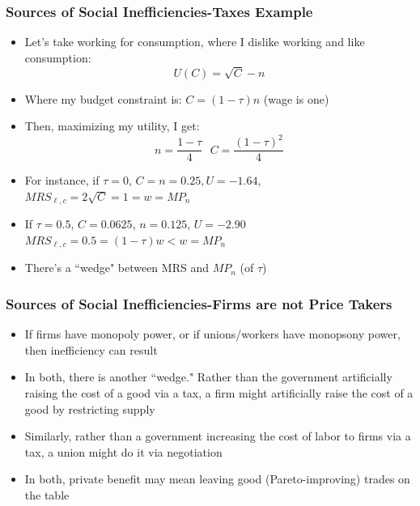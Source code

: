 \documentclass{beamer}
\begin{document}
\begin{frame}
\frametitle[alignment=center]{Sources of Social Inefficiencies-Taxes Example}
\begin{itemize}
\item Let's take working for consumption, where I dislike working and like consumption:
$$U(C)=\sqrt{C}-n$$
\item Where my budget constraint is: $C=(1-\tau)n$ (wage is one)
\bigskip
\item Then, maximizing my utility, I get:
$$n=\frac{1-\tau}{4}\ \ \ C=\frac{(1-\tau)^2}{4}$$
\bigskip
\item For instance, if $\tau=0$, $C=n=0.25,U=-1.64$, $MRS_{\ell,c}=2\sqrt{C}=1=w=MP_n$
\bigskip
\item If $\tau=0.5$, $C=0.0625$, $n=0.125$, $U=-2.90$ $MRS_{\ell,c}=0.5=(1-\tau)w<w=MP_n$
\bigskip
\item There's a ``wedge" between MRS and $MP_n$ (of $\tau$)
\end{itemize}
\end{frame}


\begin{frame}
\frametitle[alignment=center]{Sources of Social Inefficiencies-Firms are not Price Takers}
\begin{itemize}
\item If firms have monopoly power, or if unions/workers have monopsony power, then inefficiency can result
\bigskip
\item In both, there is another ``wedge."  Rather than the government artificially raising the cost of a good via a tax, a firm might artificially raise the cost of a good by restricting supply
\bigskip
\item Similarly, rather than a government increasing the cost of labor to firms via a tax, a union might do it via negotiation
\bigskip
\item In both, private benefit may mean leaving good (Pareto-improving) trades on the table
\end{itemize}
\end{frame}
\end{document}
